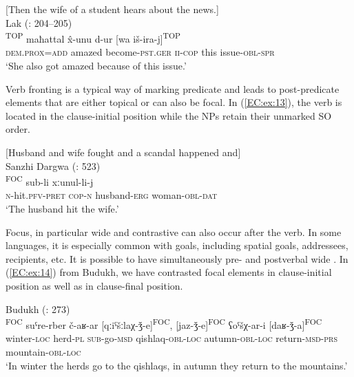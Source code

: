 \documentclass[output=paper,colorlinks,citecolor=brown,draftmode]{langscibook}
\begin{document}
\ea\label{EC:ex:12}
[Then the wife of a student hears about the news.] \\
Lak (\citealt{khalilova_lakskie_1976}: 204--205) \\
\gll [mu=gu]\textsuperscript{TOP} maħattal x̂-unu d-ur [wa iš-ira-j]\textsuperscript{TOP} \\
\textsc{dem.prox=add} amazed become\textsc{-pst.ger} \textsc{ii-cop} this issue\textsc{-obl-spr} \\
\glt `She also got amazed because of this issue.'
\z

Verb fronting is a typical way of marking predicate  and leads to post-predicate elements that are either topical or can also be focal. In (\ref{EC:ex:13}), the verb is located in the clause-initial position while the  NPs retain their unmarked SO order.

\ea\label{EC:ex:13}
[Husband and wife fought and a scandal happened and] \\
Sanzhi Dargwa (\citealt{forker_grammar_2020}: 523) \\
\gll [b-aˁq-ib ca-b]\textsuperscript{FOC} sub-li xːunul-li-j \\
\textsc{n-}hit\textsc{.pfv-pret} \textsc{cop-n} husband\textsc{-erg} woman\textsc{-obl-dat} \\
\glt `The husband hit the wife.'
\z

Focus, in particular wide  and contrastive  can also occur after the verb. In some languages, it is especially common with goals, including spatial goals, addressees, recipients, etc. It is possible to have simultaneously pre- and postverbal wide . In (\ref{EC:ex:14}) from Budukh, we have contrasted focal elements in clause-initial position as well as in clause-final position.

\ea\label{EC:ex:14}
Budukh (\citealt{talibov_buduxskij_2007}: 273) \\
\gll [q'aǯir-a]\textsuperscript{FOC} suˤre-rber č-aʁ-ar [qːiˤšːlaχ-ǯ-e]\textsuperscript{FOC}, [jaz-ǯ-e]\textsuperscript{FOC}  ʕoˤšχ-ar-i [daʁ-ǯ-a]\textsuperscript{FOC} \\
winter\textsc{-loc} herd\textsc{-pl} \textsc{sub-}go\textsc{-msd} qishlaq\textsc{-obl-loc} autumn\textsc{-obl-loc} return\textsc{-msd-prs} mountain\textsc{-obl-loc} \\
\glt `In winter the herds go to the qishlaqs, in autumn they return to the mountains.'
\z
\end{document}
